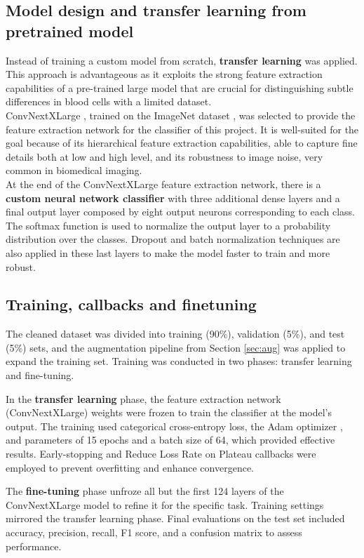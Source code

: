 \documentclass[11pt]{article}
\begin{document}
\begin{multicols}{2}
        \subsection{Model design and transfer learning from pretrained model}
        Instead of training a custom model from scratch, \textbf{transfer learning} was applied.
        This approach is advantageous as it exploits the strong feature extraction capabilities of a pre-trained large model that are crucial for distinguishing subtle differences in blood cells with a limited dataset.\\
        ConvNextXLarge \cite{liu2022convnext}, trained on the ImageNet dataset \cite{deng2009imagenet}, was selected to provide the feature extraction network for the classifier of this project. It is well-suited for the goal because of its hierarchical feature extraction capabilities, able to capture fine details both at low and high level, and its robustness to image noise, very common in biomedical imaging. \cite{keras_applications} \\
        At the end of the ConvNextXLarge feature extraction network, there is a \textbf{custom neural network classifier} with three additional dense layers and a final output layer composed by eight output neurons corresponding to each class. The softmax function is used to normalize the output layer to a probability distribution over the classes. Dropout and batch normalization techniques are also applied in these last layers to make the model faster to train and more robust. 
        \subsection{Training, callbacks and finetuning}
        The cleaned dataset was divided into training (90\%), validation (5\%), and test (5\%) sets, and the augmentation pipeline from Section \ref{sec:aug} was applied to expand the training set. Training was conducted in two phases: transfer learning and fine-tuning.

        In the \textbf{transfer learning} phase, the feature extraction network (ConvNextXLarge) weights were frozen to train the classifier at the model's output. The training used categorical cross-entropy loss, the Adam optimizer \cite{warner_optimizer}, and parameters of 15 epochs and a batch size of 64, which provided effective results. Early-stopping and Reduce Loss Rate on Plateau callbacks were employed to prevent overfitting and enhance convergence.

        The \textbf{fine-tuning} phase unfroze all but the first 124 layers of the ConvNextXLarge model to refine it for the specific task. Training settings mirrored the transfer learning phase. Final evaluations on the test set included accuracy, precision, recall, F1 score, and a confusion matrix to assess performance.
        

\end{multicols}
\end{document}
